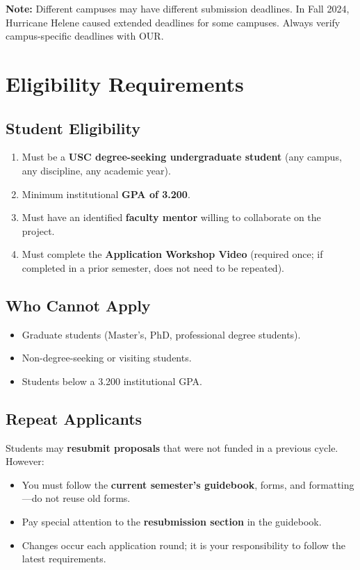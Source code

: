 \documentclass[11pt, letterpaper]{article}
\begin{document}
\textbf{Note:} Different campuses may have different submission deadlines. In Fall 2024, Hurricane Helene caused extended deadlines for some campuses. Always verify campus-specific deadlines with OUR.

\section{Eligibility Requirements}

\subsection{Student Eligibility}

\begin{enumerate}[nosep]
    \item Must be a \textbf{USC degree-seeking undergraduate student} (any campus, any discipline, any academic year).
    \item Minimum institutional \textbf{GPA of 3.200}.
    \item Must have an identified \textbf{faculty mentor} willing to collaborate on the project.
    \item Must complete the \textbf{Application Workshop Video} (required once; if completed in a prior semester, does not need to be repeated).
\end{enumerate}

\subsection{Who Cannot Apply}

\begin{itemize}[nosep]
    \item Graduate students (Master's, PhD, professional degree students).
    \item Non-degree-seeking or visiting students.
    \item Students below a 3.200 institutional GPA.
\end{itemize}

\subsection{Repeat Applicants}

Students may \textbf{resubmit proposals} that were not funded in a previous cycle. However:
\begin{itemize}[nosep]
    \item You must follow the \textbf{current semester's guidebook}, forms, and formatting---do not reuse old forms.
    \item Pay special attention to the \textbf{resubmission section} in the guidebook.
    \item Changes occur each application round; it is your responsibility to follow the latest requirements.
\end{itemize}
\end{document}
